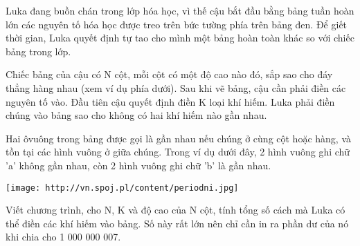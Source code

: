 Luka đang buồn chán trong lớp hóa học, vì thế cậu bắt đầu bằng bảng tuần hoàn lớn các nguyên tố hóa học được treo trên bức tường phía trên bảng đen. Để giết thời gian, Luka quyết định tự tao cho mình một bảng hoàn toàn khác so với chiếc bảng trong lớp.  

   Chiếc bảng của cậu có N cột, mỗi cột có một độ cao nào đó, sắp sao cho đáy thẳng hàng nhau (xem ví dụ phía dưới). Sau khi vẽ bảng, cậu cần phải điền các nguyên tố vào. Đầu tiên cậu quyết định điền K loại khí hiếm. Luka phải điền chúng vào bảng sao cho không có hai khí hiếm nào gần nhau.  

   Hai ôvuông trong bảng được gọi là gần nhau nếu chúng ở cùng cột hoặc hàng, và tồn tại các hình vuông ở giữa chúng. Trong ví dụ dưới đây, 2 hình vuông ghi chữ 'a' không gần nhau, còn 2 hình vuông ghi chữ 'b' là gần nhau.  


\texttt{[image: http://vn.spoj.pl/content/periodni.jpg]}

   Viết chương trình, cho N, K và độ cao của N cột, tính tổng số cách mà Luka có thể điền các khí hiếm vào bảng. Số này rất lớn nên chỉ cần in ra phần dư của nó khi chia cho 1 000 000 007.